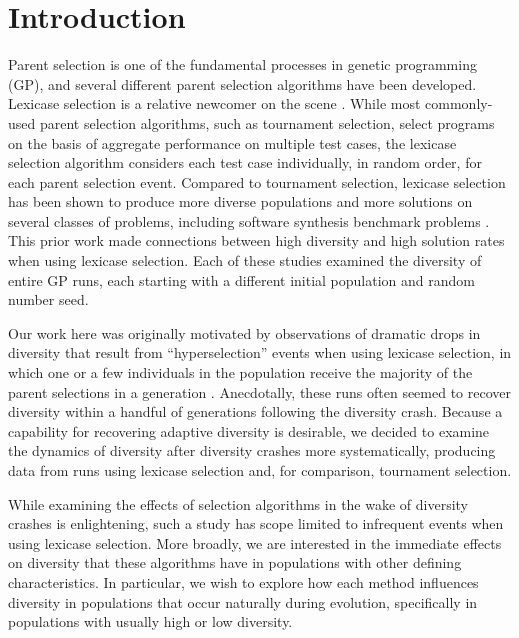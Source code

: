 \documentclass{sig-alternate-05-2015}
\begin{document}
%
%
\printccsdesc



\section{Introduction}
\label{sec:introduction}

Parent selection is one of the fundamental processes in genetic programming (GP), and several different parent selection algorithms have been developed. Lexicase selection is a relative newcomer on the scene \cite{Spector:2012:GECCOcompANEW, Helmuth:2015:ieeeTEC}. While most commonly-used parent selection algorithms, such as tournament selection, select programs on the basis of aggregate performance on multiple test cases, the lexicase selection algorithm considers each test case individually, in random order, for each parent selection event. 
Compared to tournament selection, lexicase selection has been shown to produce more diverse populations and more solutions on several classes of problems, including software synthesis benchmark problems \cite{Helmuth:2015:ieeeTEC, Helmuth:2015:dissertation, Helmuth:2015:GECCO, Helmuth:2015:GPTP}. This prior work made connections between high diversity and high solution rates when using lexicase selection. Each of these studies examined the diversity of entire GP runs, each starting with a different initial population and random number seed.

Our work here was originally motivated by observations of dramatic drops in diversity that result from ``hyperselection'' events when using lexicase selection, in which one or a few individuals in the population receive the majority of the parent selections in a generation \cite{Helmuth:2016:GECCO}. Anecdotally, these runs often seemed to recover diversity within a handful of generations following the diversity crash. Because a capability for recovering adaptive diversity is desirable, we decided to examine the dynamics of diversity  after diversity crashes more systematically, producing data from runs using lexicase selection and, for comparison, tournament selection. 

While examining the effects of selection algorithms in the wake of diversity crashes is enlightening, such a study has scope limited to infrequent events when using lexicase selection. More broadly, we are interested in the immediate effects on diversity that these algorithms have in populations with other defining characteristics. In particular, we wish to explore how each method influences diversity in populations that occur naturally during evolution, specifically in populations with usually high or low diversity.
\end{document}
